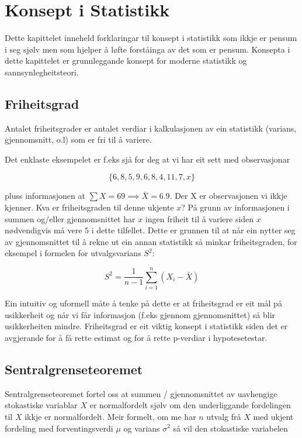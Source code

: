 \chapter{Konsept i Statistikk}

Dette kapittelet inneheld forklaringar til konsept i statistikk som ikkje er pensum i seg sjølv men som hjelper å løfte forståinga av det som er pensum. Konsepta i dette kapittelet er grunnleggande konsept for moderne statistikk og sannsynlegheitsteori.

\section{Friheitsgrad}\label{chap:friheitsgrad}
Antalet friheitsgrader er antalet verdiar i kalkulasjonen av ein statistikk (varians, gjennomsnitt, o.l) som er fri til å variere.

Det enklaste eksempelet er f.eks sjå for deg at vi har eit sett med observasjonar 

\begin{equation*}
    \{ 6, 8, 5, 9, 6, 8, 4, 11, 7, x \}
\end{equation*}

pluss informasjonen at $\sum X = 69 \implies \bar{X}=6.9$. Der X er observasjonen vi ikkje kjenner. Kva er friheitsgraden til denne ukjente $x$? På grunn av informasjonen i summen og/eller gjennomsnittet har $x$ ingen friheit til å variere siden $x$ nødvendigvis må vere $5$ i dette tilfellet. Dette er grunnen til at når ein nytter seg av gjennomsnittet til å rekne ut ein annan statistikk så minkar friheitsgraden, for eksempel i formelen for utvalgsvarians $S^2$:

\begin{equation*}
    S^2 = \frac{1}{n - 1} \sum_{i=1}^{n}(X_i - \bar{X})
\end{equation*}

Ein intuitiv og uformell måte å tenke på dette er at friheitsgrad er eit mål på usikkerheit og når vi får informasjon (f.eks gjennom gjennomsnittet) så blir usikkerheiten mindre. Friheitsgrad er eit viktig konsept i statistikk siden det er avgjerande for å få rette estimat og for å rette p-verdiar i hypotesetestar.

\section{Sentralgrenseteoremet}\label{chap:sentralgrense}

Sentralgrenseteoremet fortel oss at summen / gjennomsnittet av uavhengige stokastiske variablar $X$ er normalfordelt sjølv om den underliggande fordelingen til $X$ ikkje er normalfordelt. Meir formelt, om me har $n$ utvalg frå $X$ med ukjent fordeling med forventingsverdi $\mu$ og varians $\sigma^2$ så vil den stokastiske variabelen

